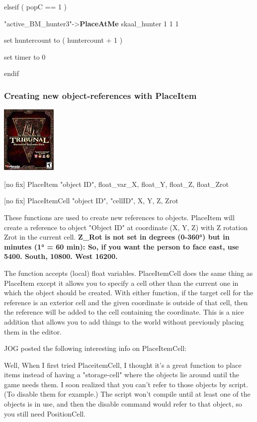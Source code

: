 \documentclass[
]{article}
\begin{document}
elseif ( popC == 1 )

"active\_BM\_hunter3"-\textgreater{}\textbf{PlaceAtMe} skaal\_hunter 1 1
1

set huntercount to ( huntercount + 1 )

set timer to 0

endif

\hypertarget{creating-new-object-references-with-placeitem}{%
\subsubsection{Creating new object-references with
PlaceItem}\label{creating-new-object-references-with-placeitem}}

\includegraphics{media/image6.png}

{[}no fix{]} PlaceItem "object ID", float\_var\_X, float\_Y, float\_Z,
float\_Zrot

{[}no fix{]} PlaceItemCell "object ID", "cellID", X, Y, Z, Zrot

These functions are used to create new references to objects. PlaceItem
will create a reference to object "Object ID" at coordinate (X, Y, Z)
with Z rotation Zrot in the current cell. \textbf{Z\_Rot is not set in
degrees (0-360°) but in minutes (1° = 60 min): So, if you want the
person to face east, use 5400. South, 10800. West 16200.}

The function accepts (local) float variables. PlaceItemCell does the
same thing as PlaceItem except it allows you to specify a cell other
than the current one in which the object should be created. With either
function, if the target cell for the reference is an exterior cell and
the given coordinate is outside of that cell, then the reference will be
added to the cell containing the coordinate. This is a nice addition
that allows you to add things to the world without previously placing
them in the editor.

JOG posted the following interesting info on PlaceItemCell:

Well, When I first tried PlaceitemCell, I thought it's a great function
to place items instead of having a "storage-cell" where the objects lie
around until the game needs them. I soon realized that you can't refer
to those objects by script. (To disable them for example.) The script
won't compile until at least one of the objects is in use, and then the
disable command would refer to that object, so you still need
PositionCell.
\end{document}
